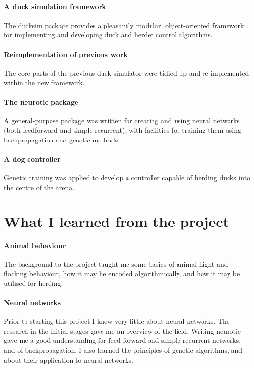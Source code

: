 \documentclass[a4paper]{report}
\newcommand{\code}[1]{{\ttfamily #1}}
\begin{document}
\paragraph{A duck simulation framework} The \code{ducksim} package
provides a pleasantly modular, object-oriented framework for
implementing and developing duck and herder control algorithms.

\paragraph{Reimplementation of previous work} The core parts of the
previous duck simulator were tidied up and re-implemented within the
new framework.

\paragraph{The \code{neurotic} package} A general-purpose package was
written for creating and using neural networks (both feedforward and
simple recurrent), with facilities for training them using
backpropagation and genetic methods.

\paragraph{A dog controller} Genetic training was applied to
develop a controller capable of herding ducks into the centre of the
arena.

\section{What I learned from the project}

\paragraph{Animal behaviour} The background to the project taught me
some basics of animal flight and flocking behaviour, how it may be
encoded algorithmically, and how it may be utilised for herding.

\paragraph{Neural networks} Prior to starting this project I knew very
little about neural networks. The research in the initial stages gave
me an overview of the field. Writing \code{neurotic} gave me a good
understanding for feed-forward and simple recurrent networks, and of
backpropagation. I also learned the principles of genetic algorithms,
and about their application to neural networks.
\end{document}
